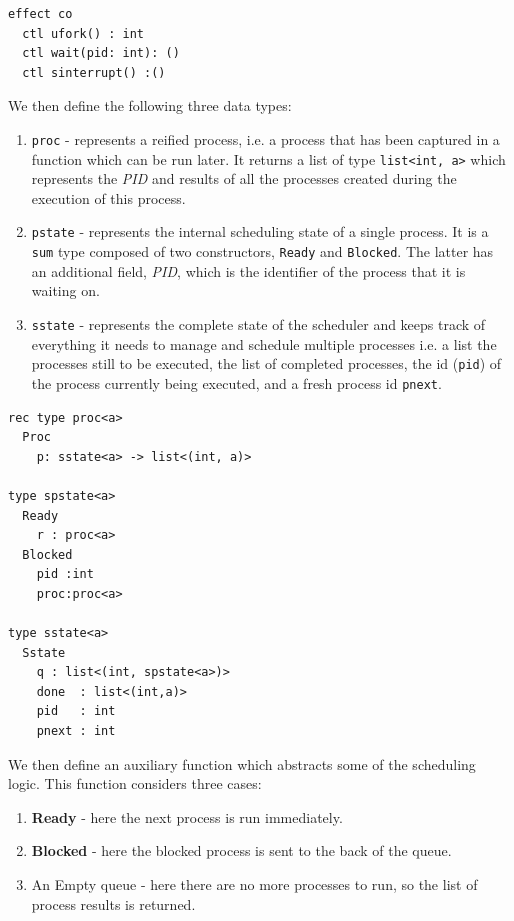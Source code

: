 \documentclass[logo,bsc,singlespacing,parskip]{infthesis}
\begin{document}
\begin{lstlisting}
effect co
  ctl ufork() : int
  ctl wait(pid: int): ()
  ctl sinterrupt() :()
\end{lstlisting}


We then define the following three data types: 

\begin{enumerate}
    \item \lstinline{proc} - represents a reified process, i.e. a process that has been captured in a function which can be run later. It returns a list of type \lstinline{list<int, a>} which represents the \textit{PID} and results of all the processes created during the execution of this process.  

    \item \lstinline{pstate} - represents the internal scheduling state of a single process. It is a \lstinline{sum} type composed of two constructors, \lstinline{Ready} and \lstinline{Blocked}. The latter has an additional field, \textit{PID}, which is the identifier of the process that it is waiting on. 

    \item \lstinline{sstate} - represents the complete state of the scheduler and keeps track of everything it needs to manage and schedule multiple processes i.e. a list the processes still to be executed, the list of completed processes, the id (\lstinline{pid}) of the process currently being executed,  and a fresh process id \lstinline{pnext}.

\end{enumerate}


\begin{lstlisting}
rec type proc<a>
  Proc
    p: sstate<a> -> list<(int, a)>

type spstate<a>
  Ready
    r : proc<a>
  Blocked 
    pid :int 
    proc:proc<a>

type sstate<a> 
  Sstate     
    q : list<(int, spstate<a>)>
    done  : list<(int,a)>
    pid   : int
    pnext : int
\end{lstlisting}


We then define an auxiliary function which abstracts some of the scheduling logic. This function considers three cases:
\begin{enumerate}
    \item \textbf{Ready} - here the next process is run immediately.
    \item \textbf{Blocked} - here the blocked process is sent to the back of the queue.
    \item An Empty queue - here there are no more processes to run, so the list of process results is returned.
\end{enumerate}
\end{document}
